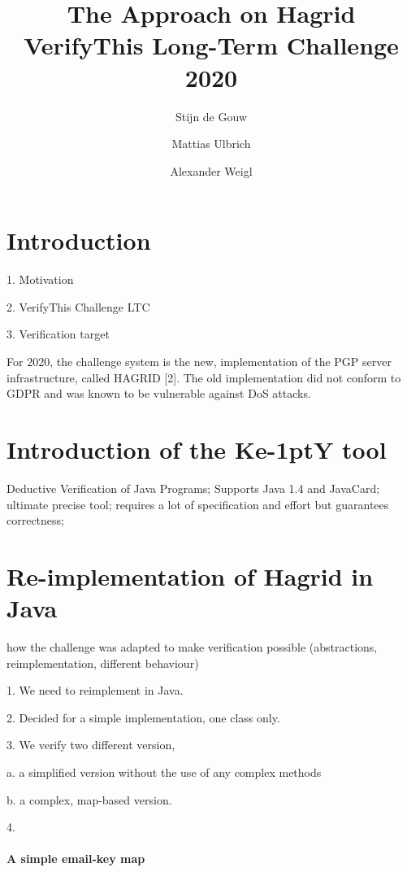 \documentclass{llncs}
\title{The \KeY Approach on Hagrid
  \\{\small VerifyThis Long-Term Challenge 2020 }}
\author{ Stijn de Gouw \and Mattias Ulbrich \and Alexander Weigl }
\institute{Open University \and Karlsruhe Institute of Technology}
\newcommand{\KeY}{Ke\kern-1ptY\xspace}
\begin{document}
\maketitle

\section{Introduction}

1. Motivation

2. VerifyThis Challenge LTC

3. Verification target 

For 2020, the challenge system is the new, implementation of the PGP server
infrastructure, called HAGRID [2]. The old implementation did not conform to
GDPR and was known to be vulnerable against DoS attacks.
    


\section{Introduction of the \KeY tool}

Deductive Verification of Java Programs; Supports Java 1.4 and JavaCard;
ultimate precise tool; requires a lot of specification and effort but guarantees
correctness;


\section{Re-implementation of Hagrid in Java}

how the challenge was adapted to make verification possible
(abstractions, reimplementation, different behaviour)

1. We need to reimplement in Java.

2. Decided for a simple implementation, one class only.

3. We verify two different version,

a. a simplified version without the use of any complex methods

b. a complex, map-based version.

4. 

\paragraph{A simple email-key map}
\end{document}
